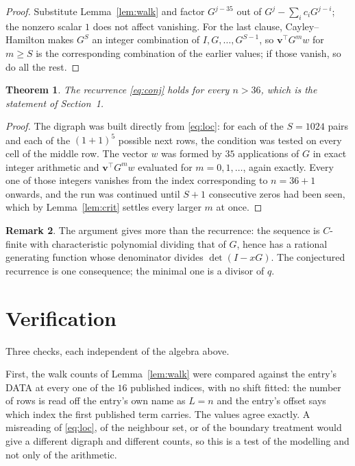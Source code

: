 \documentclass[11pt,a4paper]{article}
\theoremstyle{plain}
\newtheorem{theorem}{Theorem}
\theoremstyle{definition}
\newtheorem{remark}[theorem]{Remark}
\begin{document}
\begin{proof}
Substitute Lemma~\ref{lem:walk} and factor $G^{j-35}$ out of
$G^{j}-\sum_ic_iG^{j-i}$; the nonzero scalar $1$ does not affect
vanishing. For the last clause, Cayley--Hamilton makes $G^{S}$ an integer combination of
$I,G,\dots,G^{S-1}$, so $\mathbf{v}^{\!\top}G^{m}w$ for $m\ge S$ is the corresponding
combination of the earlier values; if those vanish, so do all the rest.
\end{proof}

\begin{theorem}
The recurrence \eqref{eq:conj} holds for every $n>36$, which is the statement of
Section~1.
\end{theorem}

\begin{proof}
The digraph was built directly from \eqref{eq:loc}: for each of the $S=1024$ pairs and each
of the $(1+1)^{5}$ possible next rows, the condition was tested on every cell of
the middle row. The vector $w$ was formed by $35$ applications of $G$ in exact integer
arithmetic and $\mathbf{v}^{\!\top}G^{m}w$ evaluated for $m=0,1,\dots$, again exactly.
Every one of those integers vanishes from the index corresponding to $n=36+1$ onwards,
and the run was continued until $S+1$ consecutive zeros had been seen, which by
Lemma~\ref{lem:crit} settles every larger $m$ at once.
\end{proof}

\begin{remark}
The argument gives more than the recurrence: the sequence is $C$-finite with characteristic
polynomial dividing that of $G$, hence has a rational generating function whose denominator
divides $\det(I-xG)$. The conjectured recurrence is one consequence; the minimal one is a
divisor of $q$.
\end{remark}

\section{Verification}

Three checks, each independent of the algebra above.

First, the walk counts of Lemma~\ref{lem:walk} were compared against the entry's DATA at
every one of the $16$ published indices, with no shift fitted: the number of rows is
read off the entry's own name as $L=n$ and the entry's offset says which index the first
published term carries. The values agree exactly. A misreading of \eqref{eq:loc}, of the
neighbour set, or of the boundary treatment would give a different digraph and different
counts, so this is a test of the modelling and not only of the arithmetic.
\end{document}
